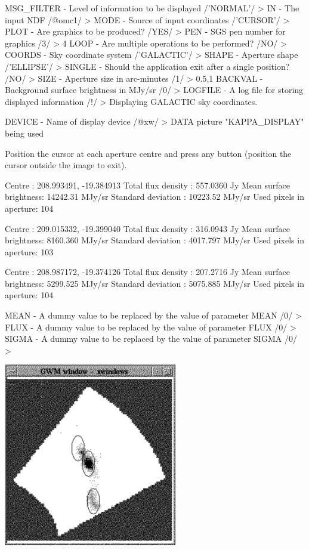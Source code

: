 \documentclass[11pt,noabs]{starlink}
\begin{document}
\begin{terminalv}
MSG_FILTER - Level of information to be displayed /'NORMAL'/ >
IN - The input NDF /@omc1/ >
MODE - Source of input coordinates /'CURSOR'/ >
PLOT - Are graphics to be produced? /YES/ >
PEN - SGS pen number for graphics /3/ > 4
LOOP - Are multiple operations to be performed? /NO/ >
COORDS - Sky coordinate system /'GALACTIC'/ >
SHAPE - Aperture shape /'ELLIPSE'/ >
SINGLE - Should the application exit after a single position? /NO/ >
SIZE - Aperture size in arc-minutes /1/ > 0.5,1
BACKVAL - Background surface brightness in MJy/sr /0/ >
LOGFILE - A log file for storing displayed information /!/ >
 Displaying GALACTIC sky coordinates.

DEVICE - Name of display device /@xw/ >
 DATA picture "KAPPA_DISPLAY" being used

 Position the cursor at each aperture centre and press any button
 (position the cursor outside the image to exit).


   Centre                 : 208.993491, -19.384913
   Total flux density     : 557.0360 Jy
   Mean surface brightness: 14242.31 MJy/sr
   Standard deviation     : 10223.52 MJy/sr
   Used pixels in aperture: 104

   Centre                 : 209.015332, -19.399040
   Total flux density     : 316.0943 Jy
   Mean surface brightness: 8160.360 MJy/sr
   Standard deviation     : 4017.797 MJy/sr
   Used pixels in aperture: 103

   Centre                 : 208.987172, -19.374126
   Total flux density     : 207.2716 Jy
   Mean surface brightness: 5299.525 MJy/sr
   Standard deviation     : 5075.885 MJy/sr
   Used pixels in aperture: 104



MEAN - A dummy value to be replaced by the value of parameter MEAN /0/ >
FLUX - A dummy value to be replaced by the value of parameter FLUX /0/ >
SIGMA - A dummy value to be replaced by the value of parameter SIGMA /0/ >
\end{terminalv}

\begin{center}
\leavevmode\includegraphics[height=80mm]{sc1_skyphot}
\end{center}
\end{document}
